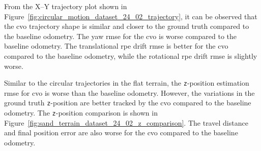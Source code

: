 \documentclass[report.tex]{subfiles}
\begin{document}

    
    
    From the X--Y trajectory plot shown in Figure~\ref{fig:circular_motion_dataset_24_02_trajectory}, it can be observed that the \gls{cvo} trajectory shape is similar and closer to the ground truth compared to the baseline odometry. The yaw \gls{rmse} for the \gls{cvo} is worse compared to the baseline odometry. The translational \gls{rpe} drift \gls{rmse} is better for the \gls{cvo} compared to the baseline odometry, while the rotational \gls{rpe} drift \gls{rmse} is slightly worse. 
        
    Similar to the circular trajectories in the flat terrain, the \texttt{z}-position estimation \gls{rmse} for \gls{cvo} is worse than the baseline odometry. However, the variations in the ground truth \texttt{z}-position are better tracked by the \gls{cvo} compared to the baseline odometry. The \texttt{z}-position comparison is shown in Figure~\ref{fig:sand_terrain_dataset_24_02_z_comparison}. The travel distance and final position error are also worse for the \gls{cvo} compared to the baseline odometry.
    
\end{document}
